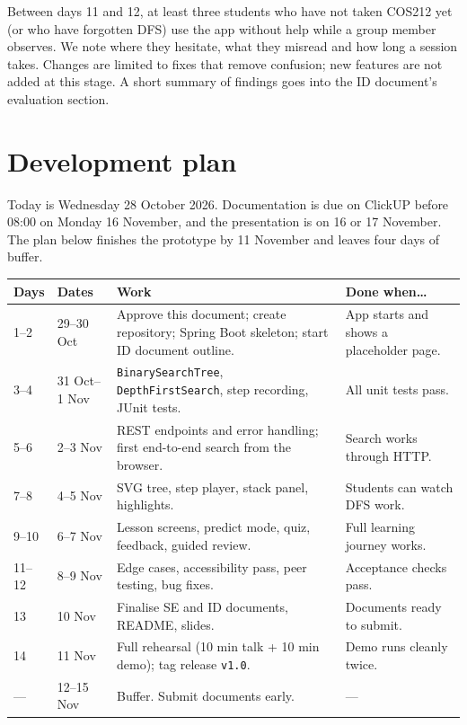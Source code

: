 \documentclass[11pt,a4paper]{article}
\newcommand{\code}[1]{\texttt{#1}}
\begin{document}
Between days 11 and 12, at least three students who have not taken COS212 yet (or who have
forgotten DFS) use the app without help while a group member observes. We note where they hesitate,
what they misread and how long a session takes. Changes are limited to fixes that remove confusion;
new features are not added at this stage. A short summary of findings goes into the ID document's
evaluation section.

\section{Development plan}
\label{sec:plan}

Today is Wednesday 28 October 2026. Documentation is due on ClickUP before 08:00 on Monday
16 November, and the presentation is on 16 or 17 November. The plan below finishes the prototype
by 11 November and leaves four days of buffer.

\begin{longtable}{@{}p{1.2cm} p{2.8cm} p{6.6cm} p{4.4cm}@{}}
  \toprule
  \textbf{Days} & \textbf{Dates} & \textbf{Work} & \textbf{Done when\ldots} \\
  \midrule
  \endhead
  1--2   & 29--30 Oct  & Approve this document; create repository; Spring Boot skeleton; start ID document outline. & App starts and shows a placeholder page. \\
  3--4   & 31 Oct--1 Nov & \code{BinarySearchTree}, \code{DepthFirstSearch}, step recording, JUnit tests. & All unit tests pass. \\
  5--6   & 2--3 Nov    & REST endpoints and error handling; first end-to-end search from the browser. & Search works through HTTP. \\
  7--8   & 4--5 Nov    & SVG tree, step player, stack panel, highlights. & Students can watch DFS work. \\
  9--10  & 6--7 Nov    & Lesson screens, predict mode, quiz, feedback, guided review. & Full learning journey works. \\
  11--12 & 8--9 Nov    & Edge cases, accessibility pass, peer testing, bug fixes. & Acceptance checks pass. \\
  13     & 10 Nov      & Finalise SE and ID documents, README, slides. & Documents ready to submit. \\
  14     & 11 Nov      & Full rehearsal (10 min talk + 10 min demo); tag release \code{v1.0}. & Demo runs cleanly twice. \\
  ---    & 12--15 Nov  & Buffer. Submit documents early. & --- \\
  \bottomrule
\end{longtable}
\end{document}
